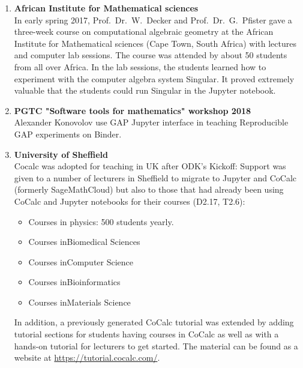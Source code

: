\begin{enumerate}
\item \textbf{African Institute for Mathematical sciences}\\
  In early spring 2017, Prof.~Dr.~W.~Decker and Prof.~Dr.~G.~Pfister
  gave a three-week course on computational algebraic geometry at the
  African Institute for Mathematical sciences (Cape Town, South
  Africa) with lectures and computer lab sessions. The course was
  attended by about 50 students from all over Africa. In the lab
  sessions, the students learned how to experiment with the computer
  algebra system Singular. It proved extremely valuable that the
  students could run Singular in the Jupyter notebook.

\item \textbf{PGTC "Software tools for mathematics" workshop 2018}\\
  Alexander Konovolov use GAP Jupyter interface in teaching
  Reproducible GAP experiments on Binder.

\item \textbf{University of Sheffield}\\
  Cocalc was adopted for teaching in UK after ODK's Kickoff: Support
  was given to a number of lecturers in Sheffield to migrate to
  Jupyter and CoCalc (formerly SageMathCloud) but also to those that
  had already been using CoCalc and Jupyter notebooks for their
  courses (D2.17, T2.6):
  \begin{itemize}
  \item Courses in physics: 500 students yearly.
  \item Courses inBiomedical Sciences
  \item Courses inComputer Science
  \item Courses inBioinformatics
  \item Courses inMaterials Science
  \end{itemize}

  In addition, a previously generated CoCalc tutorial was extended by
  adding tutorial sections for students having courses in CoCalc as
  well as with a hands-on tutorial for lecturers to get started. The
  material can be found as a website at
  \url{https://tutorial.cocalc.com/}.


\end{enumerate}
